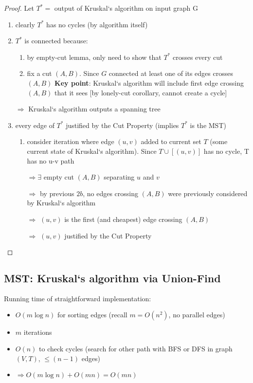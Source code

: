 \documentclass[a4paper,12pt]{article}
\theoremstyle{plain}
\theoremstyle{definition}
\theoremstyle{remark}
\begin{document}
\begin{proof}
Let $T^* =$ output of Kruskal`s algorithm on input graph G
\begin{enumerate}
	\item clearly $T^*$ has no cycles (by algorithm itself)
	\item $T^*$ is connected because:
	\begin{enumerate}
		\item by empty-cut lemma, only need to show that $T^*$ crosses every cut
		\item fix a cut $(A, B)$. Since $G$ connected at least one of its edges crosses $(A, B)$
		\textbf{Key point}: Kruskal`s algorithm will include first edge crossing $(A, B)$ that it sees [by lonely-cut corollary, cannot create a cycle]
	\end{enumerate}
	$\Rightarrow$ Kruskal`s algorithm outputs a spanning tree
	\item every edge of $T^*$ justified by the Cut Property (implies $T^*$ is the MST)
	\begin{enumerate}
		\item consider iteration where edge $(u, v)$ added to current set $T$ (some current state of Kruskal`s algorithm). Since $T \cup [(u, v)]$ has no cycle, T has no u-v path
		
		$\Rightarrow \exists$ empty cut $(A, B)$ separating $u$ and $v$
		
		$\Rightarrow$ by previous $2b$, no edges crossing $(A, B)$ were previously considered by Kruskal`s algorithm
		
		$\Rightarrow$ $(u, v)$ is the first (and cheapest) edge crossing $(A, B)$
		
		$\Rightarrow$ $(u, v)$ justified by the Cut Property
	\end{enumerate}
\end{enumerate}
\end{proof}



\subsection{MST: Kruskal`s algorithm via Union-Find}
Running time of straightforward implementation:
\begin{itemize}
	\item $O(m \log n)$ for sorting edges (recall $m = O(n^2)$, no parallel edges)
	\item $m$ iterations
	\item $O(n)$ to check cycles (search for other path with BFS or DFS in graph $(V, T)$, $\leq (n-1)$ edges)
	\item $\Rightarrow O(m \log n) + O(mn) = O(mn)$\\
\end{itemize}
\end{document}
